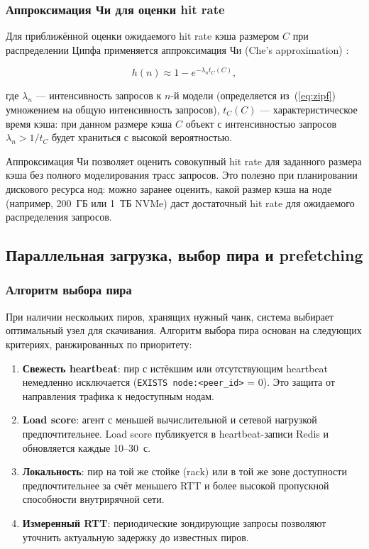 \subsubsection{Аппроксимация Чи для оценки hit rate}

Для приближённой оценки ожидаемого hit rate кэша размером $C$ при распределении Ципфа применяется аппроксимация Чи (Che's approximation) \cite{che_approx}:

\begin{equation}
h(n) \approx 1 - e^{-\lambda_n t_C(C)},
\label{eq:che}
\end{equation}

где $\lambda_n$ --- интенсивность запросов к $n$-й модели (определяется из~(\ref{eq:zipf}) умножением на общую интенсивность запросов), $t_C(C)$ --- характеристическое время кэша: при данном размере кэша $C$ объект с интенсивностью запросов $\lambda_n > 1/t_C$ будет храниться с высокой вероятностью.

Аппроксимация Чи позволяет оценить совокупный hit rate для заданного размера кэша без полного моделирования трасс запросов. Это полезно при планировании дискового ресурса нод: можно заранее оценить, какой размер кэша на ноде (например, 200~ГБ или 1~ТБ NVMe) даст достаточный hit rate для ожидаемого распределения запросов.

\subsection{Параллельная загрузка, выбор пира и prefetching}

\subsubsection{Алгоритм выбора пира}

При наличии нескольких пиров, хранящих нужный чанк, система выбирает оптимальный узел для скачивания. Алгоритм выбора пира основан на следующих критериях, ранжированных по приоритету:

\begin{enumerate}[leftmargin=*]
  \item \textbf{Свежесть heartbeat}: пир с истёкшим или отсутствующим heartbeat немедленно исключается (\texttt{EXISTS node:<peer\_id>} = 0). Это защита от направления трафика к недоступным нодам.
  \item \textbf{Load score}: агент с меньшей вычислительной и сетевой нагрузкой предпочтительнее. Load score публикуется в heartbeat-записи Redis и обновляется каждые 10--30~с.
  \item \textbf{Локальность}: пир на той же стойке (rack) или в той же зоне доступности предпочтительнее за счёт меньшего RTT и более высокой пропускной способности внутрирячной сети.
  \item \textbf{Измеренный RTT}: периодические зондирующие запросы позволяют уточнить актуальную задержку до известных пиров.
\end{enumerate}

